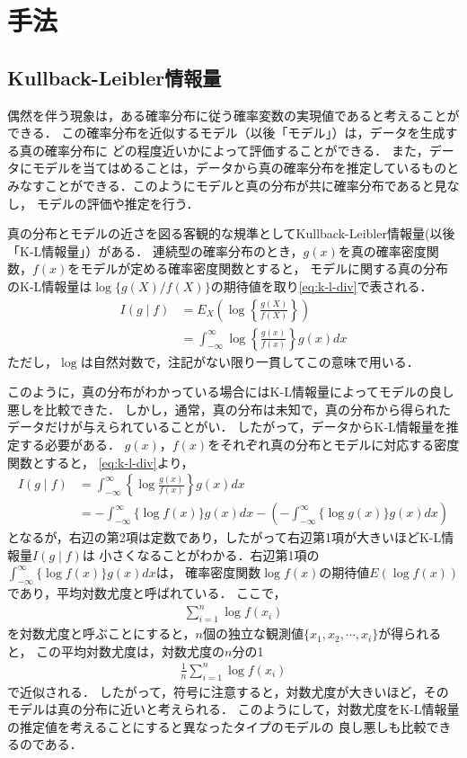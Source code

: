 \section{手法}
\subsection{Kullback-Leibler情報量}
偶然を伴う現象は，ある確率分布に従う確率変数の実現値であると考えることができる．
この確率分布を近似するモデル（以後「モデル」）は，データを生成する真の確率分布に
どの程度近いかによって評価することができる．
また，データにモデルを当てはめることは，データから真の確率分布を推定しているものと
みなすことができる．このようにモデルと真の分布が共に確率分布であると見なし，
モデルの評価や推定を行う．

真の分布とモデルの近さを図る客観的な規準としてKullback-Leibler情報量(以後「K-L情報量」）がある．
連続型の確率分布のとき，$g(x)$を真の確率密度関数，$f(x)$をモデルが定める確率密度関数とすると，
モデルに関する真の分布のK-L情報量は$\log\{g(X)/f(X)\}$の期待値を取り\eqref{eq:k-l-div}で表される．
\begin{align}
  \label{eq:k-l-div}
  I(g \mid f) &= E_X\left(\log \left\{\frac{g(X)}{f(X)}\right\}\right)\\\nonumber
              &= \int^{\infty}_{-\infty}\log\left\{\frac{g(x)}{f(x)}\right\}g(x)dx
\end{align}
ただし，$\log$は自然対数で，注記がない限り一貫してこの意味で用いる．

このように，真の分布がわかっている場合にはK-L情報量によってモデルの良し悪しを比較できた．
しかし，通常，真の分布は未知で，真の分布から得られたデータだけが与えられていることがい．
したがって，データからK-L情報量を推定する必要がある．
$g(x)$，$f(x)$をそれぞれ真の分布とモデルに対応する密度関数とすると，
\eqref{eq:k-l-div}より，
\begin{align*}
  I(g \mid f) &= \int^{\infty}_{-\infty}\left\{\log\frac{g(x)}{f(x)}\right\}g(x)dx\\\nonumber
              &= -\int^{\infty}_{-\infty}\{\log f(x)\}g(x)dx - 
                 \left(-\int^{\infty}_{-\infty}\{\log g(x)\}g(x)dx\right)
\end{align*}
となるが，右辺の第2項は定数であり，したがって右辺第1項が大きいほどK-L情報量$I(g \mid f)$は
小さくなることがわかる．右辺第1項の$\int^{\infty}_{-\infty}\{\log f(x)\}g(x)dx$は，
確率密度関数$\log f(x)$の期待値$E( \log f(x))$であり，平均対数尤度と呼ばれている．
ここで，
\begin{align*}
  \sum_{i=1}^{n}\log f(x_i)
\end{align*}
を対数尤度と呼ぶことにすると，$n$個の独立な観測値$\{x_1, x_2, \cdots, x_i\}$が得られると，
この平均対数尤度は，対数尤度の$n$分の1
\begin{align*}
  \frac{1}{n}\sum_{i=1}^{n}\log f(x_i)
\end{align*}
で近似される．
したがって，符号に注意すると，対数尤度が大きいほど，そのモデルは真の分布に近いと考えられる．
このようにして，対数尤度をK-L情報量の推定値を考えることにすると異なったタイプのモデルの
良し悪しも比較できるのである．

